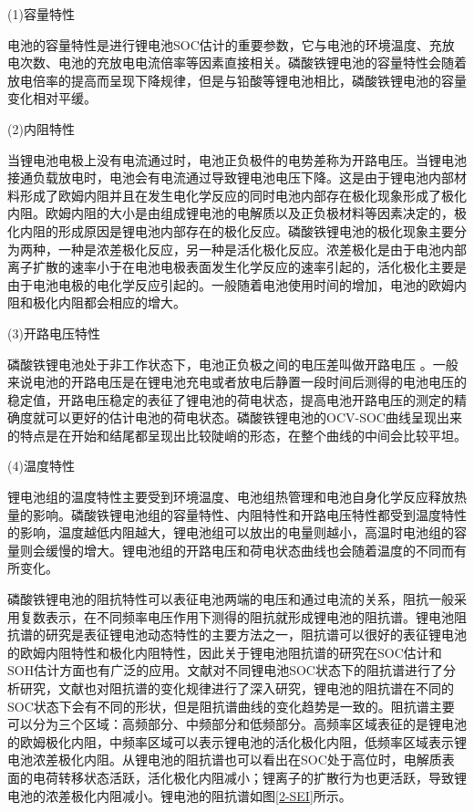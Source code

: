 (1)容量特性

	电池的容量特性是进行锂电池SOC估计的重要参数，它与电池的环境温度、充放电次数、电池的充放电电流倍率等因素直接相关。磷酸铁锂电池的容量特性会随着放电倍率的提高而呈现下降规律，但是与铅酸等锂电池相比，磷酸铁锂电池的容量变化相对平缓。

(2)内阻特性

	当锂电池电极上没有电流通过时，电池正负极件的电势差称为开路电压。当锂电池接通负载放电时，电池会有电流通过导致锂电池电压下降。这是由于锂电池内部材料形成了欧姆内阻并且在发生电化学反应的同时电池内部存在极化现象形成了极化内阻。欧姆内阻的大小是由组成锂电池的电解质以及正负极材料等因素决定的，极化内阻的形成原因是锂电池内部存在的极化反应。磷酸铁锂电池的极化现象主要分为两种，一种是浓差极化反应，另一种是活化极化反应。浓差极化是由于电池内部 离子扩散的速率小于在电池电极表面发生化学反应的速率引起的，活化极化主要是由于电池电极的电化学反应引起的。一般随着电池使用时间的增加，电池的欧姆内阻和极化内阻都会相应的增大。

(3)开路电压特性

	磷酸铁锂电池处于非工作状态下，电池正负极之间的电压差叫做开路电压 。一般来说电池的开路电压是在锂电池充电或者放电后静置一段时间后测得的电池电压的稳定值，开路电压稳定的表征了锂电池的荷电状态，提高电池开路电压的测定的精确度就可以更好的估计电池的荷电状态。磷酸铁锂电池的OCV-SOC曲线呈现出来的特点是在开始和结尾都呈现出比较陡峭的形态，在整个曲线的中间会比较平坦。

(4)温度特性

	锂电池组的温度特性主要受到环境温度、电池组热管理和电池自身化学反应释放热量的影响。磷酸铁锂电池组的容量特性、内阻特性和开路电压特性都受到温度特性的影响，温度越低内阻越大，锂电池组可以放出的电量则越小，高温时电池组的容量则会缓慢的增大。锂电池组的开路电压和荷电状态曲线也会随着温度的不同而有所变化。


磷酸铁锂电池的阻抗特性可以表征电池两端的电压和通过电流的关系，阻抗一般采用复数表示，在不同频率电压作用下测得的阻抗就形成锂电池的阻抗谱。锂电池阻抗谱的研究是表征锂电池动态特性的主要方法之一，阻抗谱可以很好的表征锂电池的欧姆内阻特性和极化内阻特性，因此关于锂电池阻抗谱的研究在SOC估计和SOH估计方面也有广泛的应用。文献对不同锂电池SOC状态下的阻抗谱进行了分析研究，文献也对阻抗谱的变化规律进行了深入研究，锂电池的阻抗谱在不同的SOC状态下会有不同的形状，但是阻抗谱曲线的变化趋势是一致的。阻抗谱主要可以分为三个区域：高频部分、中频部分和低频部分。高频率区域表征的是锂电池的欧姆极化内阻，中频率区域可以表示锂电池的活化极化内阻，低频率区域表示锂电池浓差极化内阻。从锂电池的阻抗谱也可以看出在SOC处于高位时，电解质表面的电荷转移状态活跃，活化极化内阻减小；锂离子的扩散行为也更活跃，导致锂电池的浓差极化内阻减小。锂电池的阻抗谱如图\ref{2-SEI}所示。

